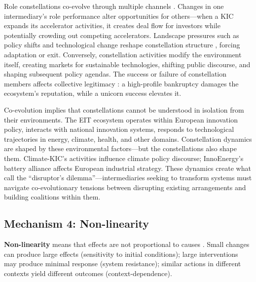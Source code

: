 \documentclass[../main.tex]{subfiles}
\begin{document}
Role constellations co-evolve through multiple channels \cite{levin1998ecosystems, walrave2018multilevel}. Changes in one intermediary's role performance alter opportunities for others---when a KIC expands its accelerator activities, it creates deal flow for investors while potentially crowding out competing accelerators. Landscape pressures such as policy shifts and technological change reshape constellation structure \cite{geels2017sustainability}, forcing adaptation or exit. Conversely, constellation activities modify the environment itself, creating markets for sustainable technologies, shifting public discourse, and shaping subsequent policy agendas. The success or failure of constellation members affects collective legitimacy \cite{suchman1995managing}: a high-profile bankruptcy damages the ecosystem's reputation, while a unicorn success elevates it.

Co-evolution implies that constellations cannot be understood in isolation from their environments. The EIT ecosystem operates within European innovation policy, interacts with national innovation systems, responds to technological trajectories in energy, climate, health, and other domains. Constellation dynamics are shaped by these environmental factors---but the constellations also shape them. Climate-KIC's activities influence climate policy discourse; InnoEnergy's battery alliance affects European industrial strategy. These dynamics create what \textcite{ansari2016disruptor} call the ``disruptor's dilemma''---intermediaries seeking to transform systems must navigate co-evolutionary tensions between disrupting existing arrangements and building coalitions within them.

\subsection{Mechanism 4: Non-linearity}

\textbf{Non-linearity} means that effects are not proportional to causes \cite{anderson1999complexity}. Small changes can produce large effects (sensitivity to initial conditions); large interventions may produce minimal response (system resistance); similar actions in different contexts yield different outcomes (context-dependence).
\end{document}
